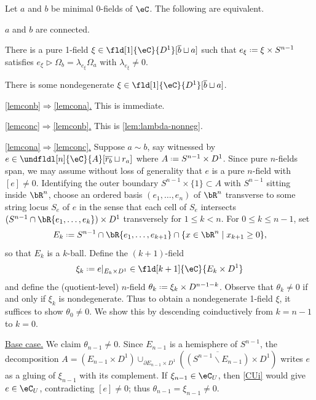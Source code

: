 \documentclass[12pt,reqno]{amsart}
\newcommand{\C}{\eC}
\newcommand{\fcj}[1]{\overline{#1}}
\newcommand{\itemstep}[1]{\smallskip\noindent\underline{#1}}
\renewcommand{\setminus}{\smallsetminus}
\renewcommand{\amalg}{\sqcup}
\DeclareRobustCommand{\coloneq}{\mathrel{\vcenter{\baselineskip0.5ex\lineskiplimit0pt\hbox{\scriptsize{\upshape.}}\hbox{\scriptsize{\upshape.}}}}=}
\newcommand{\lU}[1]{#1_U}
\begin{document}
\begin{proposition}\label{lemcon}
Let $a$ and $b$ be minimal $0$-fields of $\C$. The following are equivalent.
\begin{lst}
\item[(a)]\label{lemcona}
$a$ and $b$ are connected.
\item[(b)]\label{lemconb}
There is a pure 1-field $\xi \in \fld[1]{\C}{D^1}[ \fcj b \amalg a]$ such that
$e_\xi \coloneq \xi \times S^{n-1}$ satisfies $e_\xi \triangleright \Omega_b = \lambda_{e_\xi}\Omega_a$ with $\lambda_{e_\xi} \neq 0$.
\item[(c)]\label{lemconc}
There is some nondegenerate $\xi \in \fld[1]{\C}{D^1}[ \fcj b \amalg a]$.
\end{lst}
\end{proposition}

\begin{pf}
\itemstep{\ref{lemconb}$\Rightarrow$\ref{lemcona}.} This is immediate.

\itemstep{\ref{lemconc}$\Rightarrow$\ref{lemconb}.} This is \cref{lem:lambda-nonneg}.   

\itemstep{\ref{lemcona}$\Rightarrow$\ref{lemconc}.} Suppose $a \sim b$, say witnessed by
$e \in \undfldl[n]{\C}{A}[ \fcj{r_b}\amalg r_a]$ where $A\coloneq S^{n-1}\times D^1$. Since pure $n$-fields span, we may assume without loss of generality that $e$ is a pure $n$-field with $[e] \neq 0$. Identifying the outer boundary $S^{n-1}\times\{1\}\subset A$ with $S^{n-1}$ sitting inside $\bR^n$, choose an ordered basis $(e_1,\dots,e_n)$ of $\bR^n$ transverse to some string locus $S_e$ of $e$ in the sense that each cell of $S_e$ intersects $(S^{n-1}\cap\bR\{e_1,\dots,e_k\})\times D^1$ transversely for $1\leq k<n$. For $0 \leq k \leq n-1$, set
\[
E_k \coloneq S^{n-1} \cap \bR\{e_1, \dots, e_{k+1}\} \cap \{x\in\bR^n\mid x_{k+1} \geq 0\},   
\]
so that $E_k$ is a $k$-ball. Define the $(k+1)$-field
\[
\xi_k \coloneq e|_{E_k \times D^1}\in\fld[k+1]{\C}{E_k \times D^1}
\]
and define the (quotient-level) $n$-field $\theta_k \coloneq \xi_k \times D^{n-1-k}$. Observe that $\theta_k\neq 0$ if and only if $\xi_k$ is nondegenerate. Thus to obtain a nondegenerate 1-field $\xi$, it suffices to show $\theta_0\neq 0$. We show this by descending coinductively from $k=n-1$ to $k=0$.

\itemstep{Base case.} We claim $\theta_{n-1}\neq 0$. Since $E_{n-1}$ is a hemisphere of $S^{n-1}$, the decomposition $A = (E_{n-1}\times D^1)\cup_{\partial E_{n-1}\times D^1}(\overline{(S^{n-1}\setminus E_{n-1})}\times D^1)$ writes $e$ as a gluing of $\xi_{n-1}$ with its complement. If $\xi_{n-1}\in\lU{\C}$, then \ref{CUi} would give $e\in\lU{\C}$, contradicting $[e]\neq 0$; thus $\theta_{n-1}=\xi_{n-1}\neq 0$.


\end{pf}
\end{document}
